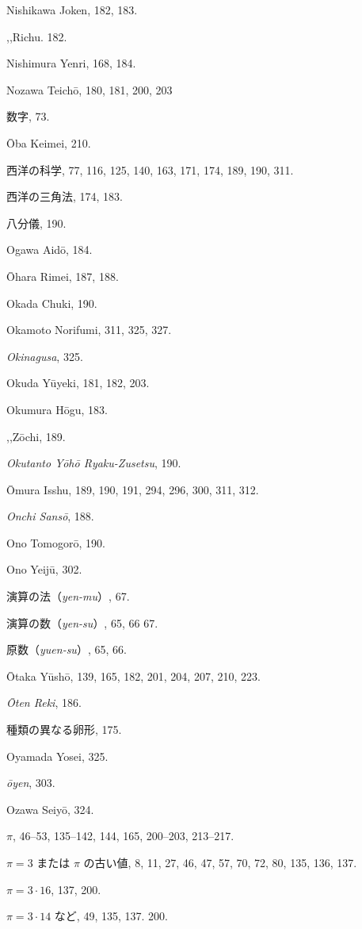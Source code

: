 \documentclass[11pt]{article}
\begin{document}
Nishikawa Joken, 182, 183.\par
\quad ,,\quad Richu. 182.\par
Nishimura Yenri, 168, 184.\par
Nozawa Teichō, 180, 181, 200, 203\par
数字, 73.\par
\medskip
Ōba Keimei, 210.\par
西洋の科学, 77, 116, 125, 140, 163, 171, 174, 189, 190, 311.\par
西洋の三角法, 174, 183.\par
八分儀, 190.\par
Ogawa Aidō, 184.\par
Ōhara Rimei, 187, 188.\par
Okada Chuki, 190.\par
Okamoto Norifumi, 311, 325, 327.\par
\emph{Okinagusa}, 325.\par
Okuda Yūyeki, 181, 182, 203.\par
Okumura Hōgu, 183.\par
\quad ,,\quad Zōchi, 189.\par
\emph{Okutanto Yōhō Ryaku-Zusetsu}, 190.\par
Ōmura Isshu, 189, 190, 191, 294, 296, 300, 311, 312.\par
\emph{Onchi Sansō}, 188.\par
Ono Tomogorō, 190.\par
Ono Yeijū, 302.\par
演算の法（\emph{yen-mu}）, 67.\par
演算の数（\emph{yen-su}）, 65, 66 67.\par
原数（\emph{yuen-su}）, 65, 66.\par
Ōtaka Yūshō, 139, 165, 182, 201, 204, 207, 210, 223.\par
\emph{Ōten Reki}, 186.\par
種類の異なる卵形, 175.\par
Oyamada Yosei, 325.\par
\emph{ōyen}, 303.\par
Ozawa Seiyō, 324.\par
\medskip
$\pi$, 46--53, 135--142, 144, 165, 200--203, 213--217.\par
$\pi = 3$ または $\pi$ の古い値, 8, 11, 27, 46, 47, 57, 70, 72, 80, 135, 136, 137.\par
$\pi = 3\cdot 16$, 137, 200.\par
$\pi = 3\cdot 14$ など, 49, 135, 137. 200.\par
\end{document}

